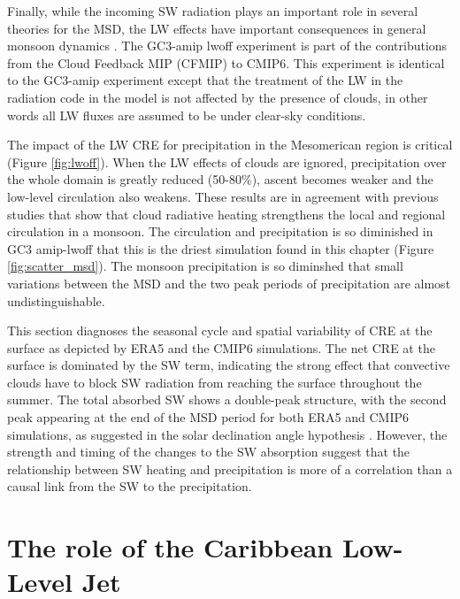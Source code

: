 Finally, while the incoming SW radiation plays an important role in several theories for the MSD, the LW effects have important consequences in general monsoon dynamics \citep{guo2015,byrne2020}. 
The GC3-amip lwoff experiment is part of the contributions from the Cloud Feedback MIP (CFMIP)  \citep{webb2017} to CMIP6. This experiment is identical to the GC3-amip experiment except that the treatment of the LW in the radiation code in the model is not affected by the presence of clouds, in other words all LW fluxes are assumed to be under clear-sky conditions. 

The impact of the LW CRE for precipitation in the Mesomerican region is critical (Figure \ref{fig:lwoff}). When the LW effects of clouds are ignored, precipitation over the whole domain is greatly reduced (50-80\%), ascent becomes weaker and the low-level circulation also weakens. 
These results are in agreement with previous studies \citep{guo2015,byrne2020} that show that cloud radiative heating strengthens the local and regional circulation in a monsoon. The circulation and precipitation is so diminished in GC3 amip-lwoff that this is the driest simulation found in this chapter (Figure \ref{fig:scatter_msd}). The monsoon precipitation is so diminshed that small variations between the MSD and the two peak periods of precipitation are almost undistinguishable. 

This section diagnoses the seasonal cycle and spatial variability of CRE at the surface as depicted by ERA5 and the CMIP6 simulations. The net CRE at the surface is dominated by the SW term, indicating the strong effect that convective clouds have to block SW radiation from reaching the surface throughout the summer. The total absorbed SW shows a double-peak structure, with the second peak appearing at the end of the MSD period for both ERA5 and CMIP6 simulations, as suggested in the solar declination angle hypothesis \cite{karnauskas2013}. However, the strength and timing of the changes to the SW absorption suggest that the relationship between SW heating and precipitation is more of a correlation than a causal link from the SW to the precipitation. 



\section{The role of the Caribbean Low-Level Jet}



